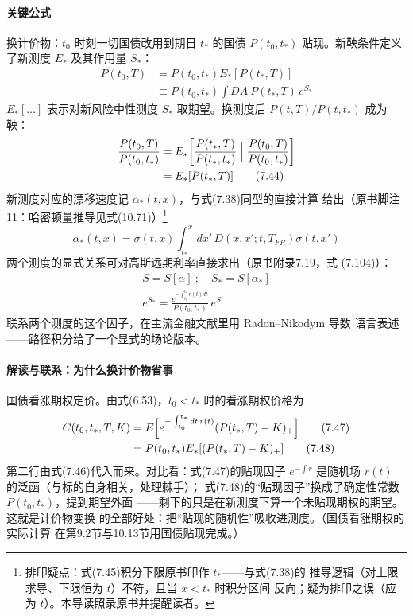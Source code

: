 \paragraph{关键公式}
换计价物：$t_0$ 时刻一切国债改用到期日 $t_*$ 的国债 $P(t_0,t_*)$
贴现。新鞅条件定义了新测度 $E_*$ 及其作用量 $S_*$：
\begin{align*}
P(t_0,T)&=P(t_0,t_*)E_{*}[P(t_*,T)]
\tag{7.42}\\
&\equiv P(t_0,t_*)\int DA\ P(t_*,T)\,e^{S_*}
\tag{7.43}
\end{align*}
$E_*[\ldots]$ 表示对新风险中性测度 $S_*$ 取期望。换测度后
$P(t,T)/P(t,t_*)$ 成为鞅：
\begin{align*}
\frac{P(t_0,T)}{P(t_0,t_*)}
&=E_{*}\biggl[\frac{P(t_*,T)}{P(t_*,t_*)}\Bigm|
\frac{P(t_0,T)}{P(t_0,t_*)}\biggr]\\
&=E_{*}[P(t_*,T)]
\tag{7.44}
\end{align*}
新测度对应的漂移速度记 $\alpha_*(t,x)$，与式(7.38)同型的直接计算
给出（原书脚注11：哈密顿量推导见式(10.71)）\footnote{排印疑点：式(7.45)积分下限原书印作 $t_*$——与式(7.38)的
推导逻辑（对上限求导、下限恒为 $t$）不符，且当 $x<t_*$ 时积分区间
反向；疑为排印之误（应为 $t$）。本导读照录原书并提醒读者。}
\begin{equation*}
\alpha_{*}(t,x)=\sigma(t,x)\int_{t_{*}}^{x}dx'\,
D(x,x';t,T_{FR})\sigma(t,x')
\tag{7.45}
\end{equation*}
两个测度的显式关系可对高斯远期利率直接求出（原书附录7.19，式
(7.104)）：
\begin{gather*}
S=S[\alpha]\ ;\quad S_{*}=S[\alpha_{*}]\\
e^{S_{*}}=\frac{e^{-\int_{t_0}^{t_*}r(t)dt}}{P(t_0,t_*)}\,e^{S}
\tag{7.46}
\end{gather*}
联系两个测度的这个因子，在主流金融文献里用 Radon--Nikodym 导数
语言表述——路径积分给了一个显式的场论版本。

\paragraph{解读与联系：为什么换计价物省事}
国债看涨期权定价。由式(6.53)，$t_0<t_*$ 时的看涨期权价格为
\begin{align*}
C(t_0,t_*,T,K)&=E\Bigl[e^{-\int_{t_0}^{t_*}dt\,r(t)}
(P(t_*,T)-K)_{+}\Bigr]
\tag{7.47}\\
&=P(t_0,t_{*})E_{*}[(P(t_{*},T)-K)_{+}]
\tag{7.48}
\end{align*}
第二行由式(7.46)代入而来。对比看：式(7.47)的贴现因子
$e^{-\int r}$ 是随机场 $r(t)$ 的泛函（与标的自身相关，处理棘手）；
式(7.48)的“贴现因子”换成了确定性常数 $P(t_0,t_*)$，提到期望外面
——剩下的只是在新测度下算一个未贴现期权的期望。这就是计价物变换
的全部好处：把“贴现的随机性”吸收进测度。（国债看涨期权的实际计算
在第9.2节与10.13节用国债贴现完成。）

